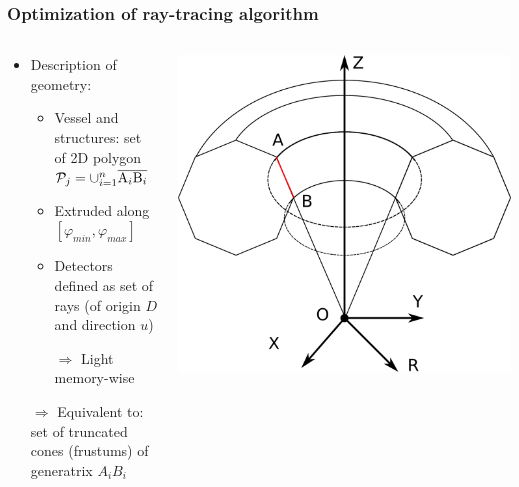 \documentclass[10pt]{beamer}
\begin{document}
\begin{frame}
\frametitle{Optimization of ray-tracing algorithm}

\begin{columns}
\begin{column}{0.65\textwidth}
	\begin{itemize}
	\item Description of geometry:
	\begin{itemize}
		\item Vessel and structures:  set of 2D polygon $\mathcal{P}_j = \cup_{i=1}^n \overline{{\rm A}_i{\rm B}_i}$
		\item Extruded along $[\varphi_{min}, \varphi_{max}]$
		\item Detectors defined as set of rays (of origin $D$ and direction $u$)
		\item[{$\Rightarrow$}] Light memory-wise
	\end{itemize}
	\item[{$\Rightarrow$}] Equivalent to: set of truncated cones (frustums) of generatrix $A_iB_i$
	
	\end{itemize}
\end{column}
\begin{column}{0.35\textwidth}
\begin{center}
    	\includegraphics[width=\linewidth]{figures/tore_cones1.pdf}
\end{center}
\end{column}
\end{columns}


\end{frame}
\end{document}
